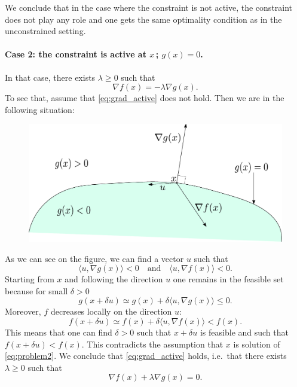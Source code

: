 \documentclass[11pt,nocut]{article}
\begin{document}
We conclude that in the case where the constraint is not active, the constraint does not play any role and one gets the same optimality condition as in the unconstrained setting.

\paragraph{Case 2: the constraint is active at $x\,$; $g(x) = 0$.}
In that case, there exists $\lambda \geq 0$ such that 
\begin{equation}\label{eq:grad_active}
	\nabla f(x) = - \lambda \nabla g(x).
\end{equation}
To see that, assume that \eqref{eq:grad_active} does not hold. Then we are in the following situation:
\begin{figure}[H]
	\begin{center}
		\includegraphics[width=0.8\linewidth]{figures/absurd.pdf}
	\end{center}
\end{figure}

As we can see on the figure, we can find a vector $u$ such that
$$
\langle u, \nabla g(x) \rangle < 0 
\quad \text{and} \quad
\langle u, \nabla f(x) \rangle < 0.
$$
Starting from $x$ and following the direction $u$ one remains in the feasible set because for small $\delta >0$
$$
g(x + \delta u) \simeq g(x) + \delta \langle u, \nabla g(x) \rangle \leq 0.
$$
Moreover, $f$ decreases locally on the direction $u$:
$$
f(x + \delta u) \simeq f(x) + \delta \langle u, \nabla f(x) \rangle < f(x).
$$
This means that one can find $\delta > 0$ such that $x + \delta u$ is feasible and such that $f(x + \delta u) < f(x)$. This contradicts the assumption that $x$ is solution of \eqref{eq:problem2}.
We conclude that \eqref{eq:grad_active} holds, i.e.\ that there exists $\lambda \geq 0$ such that
$$
\nabla f(x) + \lambda \nabla g(x) = 0.
$$

\end{document}
